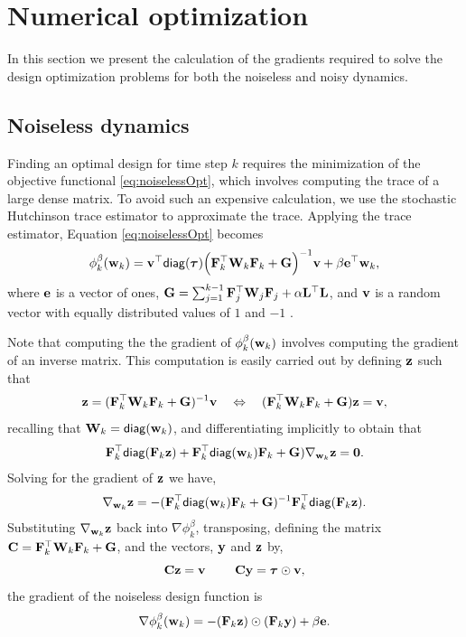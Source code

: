 \documentclass[final,leqno,onefignum,onetabnum]{siamltexmm}
\begin{document}
\section{Numerical optimization}
\label{sec:Opt}
In this section we present the calculation of the gradients required to solve the design optimization problems for both the noiseless and noisy dynamics. 
%
\subsection{Noiseless dynamics}
Finding an optimal design for  time step $k$ requires the minimization of the objective functional \eqref{eq:noiselessOpt}, which involves computing the trace of a large dense matrix. To avoid such an expensive calculation, we use the stochastic Hutchinson trace estimator to approximate the trace. Applying the trace estimator, Equation \eqref{eq:noiselessOpt} becomes
%
\begin{align}
\phi_k^{\beta}({\bf{w}}_k) = {\bf{v}}^{\top}{\sf diag}({\boldsymbol \tau}) \Big({\bf{F}}_k^{\top}{\bf{W}}_k{\bf{F}}_k   + {\bf{G}} \Big)^{-1}{\bf{v}} + \beta{\bf{e}}^{\top}{\bf{w}}_k,
\end{align}
%
where ${\bf{e}}$ is a vector of ones, ${\bf{G}} = \sum_{j=1}^{k-1}{\bf{F}}_{j}^{\top}{\bf{W}}_{j}{\bf{F}}_{j}+ \alpha{\bf{L}}^{\top}{\bf{L}}$, and ${\bf{v}}$ is a random vector with equally distributed values of $1$ and $-1$ \cite{Hutchinson1990,Haber2011}. 


Note that computing the the gradient of $\phi_k^{\beta}({\bf{w}}_k)$ involves computing the gradient of an inverse matrix.
This computation is easily carried out by defining ${\bf{z}}$ such that
%
\begin{align}
\label{eq:z}
\bfz = (\bfF_k^{\top}\bfW_k\bfF_k   + \bfG)^{-1}\bfv \quad \Leftrightarrow \quad
(\bfF_k^{\top}\bfW_k\bfF_k   + \bfG)\bfz = \bfv,
\end{align}
%
recalling that ${\bf{W}}_k = {\sf diag}({\bf{w}}_k)$, and differentiating implicitly to obtain that
%
\begin{align}
{\bf{F}}_k^{\top}{\sf diag}({\bf{F}}_k{\bf{z}}) + {\bf{F}}_k^{\top}{\sf diag}({\bf{w}}_k){\bf{F}}_k +{\bf{G}}){\bf{ \nabla}}_{{\bf{w}}_k}{\bf{z}} ={\bf 0}.
\end{align}
%
Solving for the gradient of ${\bf{z}}$ we have,
%
\begin{align}
\nabla_{{\bf{w}}_k}{\bf{z}} = -({\bf{F}}_k^{\top}{\sf diag}({\bf{w}}_k){\bf{F}}_k +{\bf{G}})^{-1} {\bf{F}}_k^{\top}{\sf diag}({\bf{F}}_k{\bf{z}}).
\end{align}
%
Substituting $\nabla_{{\bf{w}}_k}{\bf{z}}$ back into $\nabla\phi_k^{\beta}$, transposing, defining the matrix ${\bf{C}} = {\bf{F}}_k^{\top}{\bf{W}}_k{\bf{F}}_k   + {\bf{G}}$, and the vectors, ${\bf{y}}$ and ${\bf{z}}$ by, 
$${\bf{C}}{\bf{z}} = {\bf{v}}\ \quad \quad {\bf{C}}{\bf{y}} ={\boldsymbol \tau}\odot{\bf{v}}, $$ 
the gradient of the noiseless design function is
%
\begin{align}
\nabla\phi_k^{\beta}({\bf{w}}_k) =  -({\bf{F}}_k{\bf{z}})\odot({\bf{F}}_k{\bf{y}}) + \beta{\bf{e}}.
\end{align}
%
\end{document}
